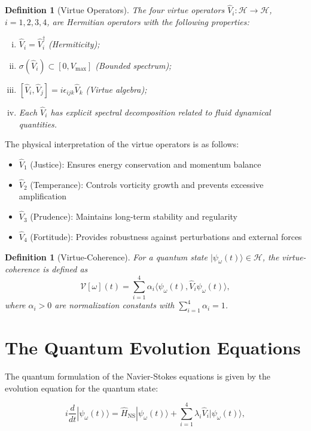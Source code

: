 \documentclass[11pt]{article}
\newtheorem{definition}[theorem]{Definition}
\newcommand{\HH}{\mathcal{H}}
\newcommand{\VV}{\mathcal{V}}
\newcommand{\inner}[2]{\langle #1, #2 \rangle}
\begin{document}
\begin{definition}[Virtue Operators]\label{def:virtue}
The four virtue operators $\hat{V}_i: \HH \to \HH$, $i = 1,2,3,4$, are Hermitian operators with the following properties:
\begin{enumerate}[(i)]
\item $\hat{V}_i = \hat{V}_i^\dagger$ (Hermiticity);
\item $\sigma(\hat{V}_i) \subset [0, V_{\max}]$ (Bounded spectrum);
\item $[\hat{V}_i, \hat{V}_j] = i\epsilon_{ijk} \hat{V}_k$ (Virtue algebra);
\item Each $\hat{V}_i$ has explicit spectral decomposition related to fluid dynamical quantities.
\end{enumerate}
\end{definition}

The physical interpretation of the virtue operators is as follows:
\begin{itemize}
\item $\hat{V}_1$ (Justice): Ensures energy conservation and momentum balance
\item $\hat{V}_2$ (Temperance): Controls vorticity growth and prevents excessive amplification  
\item $\hat{V}_3$ (Prudence): Maintains long-term stability and regularity
\item $\hat{V}_4$ (Fortitude): Provides robustness against perturbations and external forces
\end{itemize}

\begin{definition}[Virtue-Coherence]\label{def:coherence}
For a quantum state $|\psi_\omega(t)\rangle \in \HH$, the virtue-coherence is defined as
\[
\VV[\omega](t) = \sum_{i=1}^4 \alpha_i \inner{\psi_\omega(t)}{\hat{V}_i \psi_\omega(t)},
\]
where $\alpha_i > 0$ are normalization constants with $\sum_{i=1}^4 \alpha_i = 1$.
\end{definition}

\section{The Quantum Evolution Equations}

The quantum formulation of the Navier-Stokes equations is given by the evolution equation for the quantum state:

\begin{equation}\label{eq:quantum_evolution}
i\frac{d}{dt}|\psi_\omega(t)\rangle = \hat{H}_{\text{NS}}|\psi_\omega(t)\rangle + \sum_{i=1}^4 \lambda_i \hat{V}_i |\psi_\omega(t)\rangle,
\end{equation}
\end{document}
